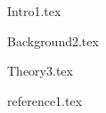\documentclass{ctuthesis}
\begin{document}
\maketitle


{Intro1.tex}

{Background2.tex}

{Theory3.tex}







{reference1.tex}
\end{document}
